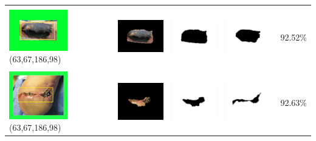 \begin{table}[H]
\begin{tabular}{|m{1.0in}|m{1.0in}|m{1.0in}|m{1.0in}|m{0.6in}|}
		&  &  & \\
		\includegraphics[width=1.0in]{gambar/hasil_segmentasi/luka_hitam/image_22_rect.jpg} {\centering\fontsize{10}{10}\selectfont(63,67,186,98)}&
		\includegraphics[width=1.0in]{gambar/hasil_segmentasi/luka_hitam/result_22.jpg}&
		\includegraphics[width=1.0in]{gambar/hasil_segmentasi/luka_hitam/mask_r_22.jpg}&
		\includegraphics[width=1.0in]{gambar/hasil_segmentasi/luka_hitam/22_r.jpg}&
		92.52\% \\
		\hline 

		&  &  & \\
		\includegraphics[width=1.0in]{gambar/hasil_segmentasi/luka_hitam/image_16_rect.jpg} {\centering\fontsize{10}{10}\selectfont(63,67,186,98)}&
		\includegraphics[width=1.0in]{gambar/hasil_segmentasi/luka_hitam/result_16.jpg}&
		\includegraphics[width=1.0in]{gambar/hasil_segmentasi/luka_hitam/mask_r_16.jpg}&
		\includegraphics[width=1.0in]{gambar/hasil_segmentasi/luka_hitam/16_r.jpg}&
		92.63\% \\
		\hline 

	\end{tabular}
\end{table}



